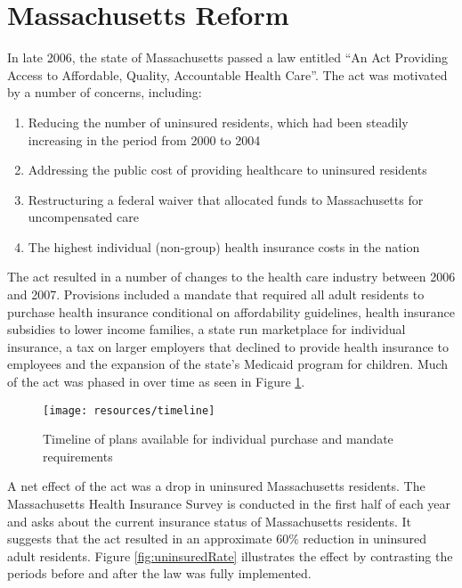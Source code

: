 \documentclass[12pt]{article}
\begin{document}
\section{Massachusetts Reform}
\label{sec:reform}


In late 2006, the state of Massachusetts passed a law entitled ``An Act Providing Access to Affordable, Quality, Accountable Health Care''. The act was motivated by a number of concerns, including:

\begin{enumerate}
\item Reducing the number of uninsured residents, which had been steadily increasing in the period from 2000 to 2004 \cite{bisweek}
\item Addressing the public cost of providing healthcare to uninsured residents \cite{npr}
\item Restructuring a federal waiver that allocated funds to Massachusetts for uncompensated care \cite{heritage}
\item The highest individual (non-group) health insurance costs in the nation \cite{gruber_mass}
\end{enumerate}

The act resulted in a number of changes to the health care industry between 2006 and 2007. Provisions included a mandate that required all adult residents to purchase health insurance conditional on affordability guidelines, health insurance subsidies to lower income families, a state run marketplace for individual insurance, a tax on larger employers that declined to provide health insurance to employees and the expansion of the state's Medicaid program for children. Much of the act was phased in over time as seen in Figure \ref{fig:reformTimeline}.

\begin{figure}[H]
	\centering
	\texttt{[image: resources/timeline]}
	\caption{Timeline of plans available for individual purchase and mandate requirements}
	\label{fig:reformTimeline}
\end{figure}

A net effect of the act was a drop in uninsured Massachusetts residents. The Massachusetts Health Insurance Survey is conducted in the first half of each year and asks about the current insurance status of Massachusetts residents. It suggests that the act resulted in an approximate 60\% reduction in uninsured adult residents. Figure \ref{fig:uninsuredRate} illustrates the effect by contrasting the periods before and after the law was fully implemented. 
\end{document}
